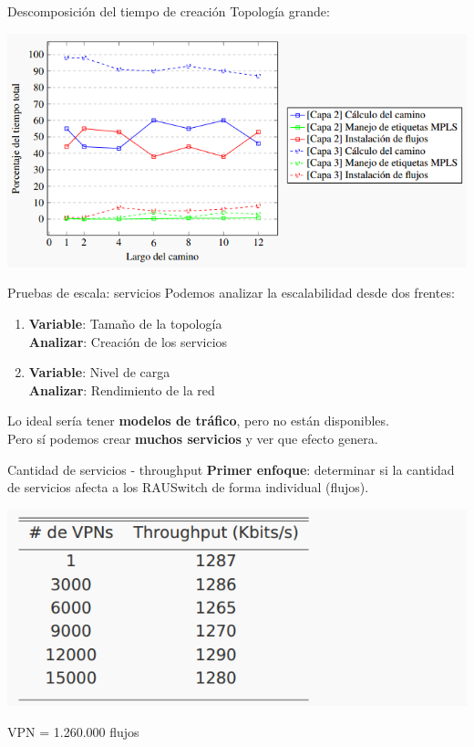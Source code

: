 \documentclass[xcolor=svgnames]{beamer}
\begin{document}
\begin{frame}{Descomposición del tiempo de creación}
	Topología grande:
	\begin{center}
		\includegraphics[scale=0.6]{porcentajes_tiempos_grande}
	\end{center}
\end{frame}

\begin{frame}{Pruebas de escala: servicios}
	Podemos analizar la escalabilidad desde dos frentes:
	\begin{enumerate}
		\item {\color{gray}\textbf{Variable}: Tamaño de la topología \\
		\textbf{Analizar}: Creación de los servicios}
		\item {\textbf{Variable}: Nivel de carga \\
		\textbf{Analizar}: Rendimiento de la red \\}
	\end{enumerate}
	\pause
	Lo ideal sería tener \textbf{modelos de tráfico}, pero no están disponibles. \\
	\pause
	Pero sí podemos crear \textbf{muchos servicios} y ver que efecto genera.
\end{frame}

\begin{frame}{Cantidad de servicios - throughput}
	\textbf{Primer enfoque}: determinar si la cantidad de servicios afecta a los RAUSwitch de forma individual (flujos).
	\pause
	\begin{center}
		\includegraphics[scale=0.6]{throughput1}
	\end{center}
	 VPN = 1.260.000 flujos
\end{frame}
\end{document}

